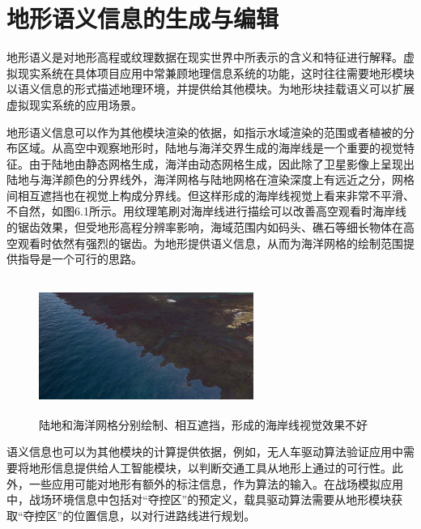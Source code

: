 
\chapter{地形语义信息的生成与编辑}
地形语义是对地形高程或纹理数据在现实世界中所表示的含义和特征进行解释。虚拟现实系统在具体项目应用中常兼顾地理信息系统的功能\supercite{沈敬伟}，这时往往需要地形模块以语义信息的形式描述地理环境，并提供给其他模块。为地形块挂载语义可以扩展虚拟现实系统的应用场景。\par
地形语义信息可以作为其他模块渲染的依据，如指示水域渲染的范围或者植被的分布区域。从高空中观察地形时，陆地与海洋交界生成的海岸线是一个重要的视觉特征。由于陆地由静态网格生成，海洋由动态网格生成，因此除了卫星影像上呈现出陆地与海洋颜色的分界线外，海洋网格与陆地网格在渲染深度上有远近之分，网格间相互遮挡也在视觉上构成分界线。但这样形成的海岸线视觉上看来非常不平滑、不自然，如图6.1所示。用纹理笔刷对海岸线进行描绘可以改善高空观看时海岸线的锯齿效果，但受地形高程分辨率影响，海域范围内如码头、礁石等细长物体在高空观看时依然有强烈的锯齿。为地形提供语义信息，从而为海洋网格的绘制范围提供指导是一个可行的思路。\par
\begin{figure}[H]
    \centering
    \includegraphics[height=4.4cm,width=7cm]{figures/shoreBad.png}
    \caption{陆地和海洋网格分别绘制、相互遮挡，形成的海岸线视觉效果不好}
\end{figure}
语义信息也可以为其他模块的计算提供依据，例如，无人车驱动算法验证应用中需要将地形信息提供给人工智能模块，以判断交通工具从地形上通过的可行性。此外，一些应用可能对地形有额外的标注信息，作为算法的输入。在战场模拟应用中，战场环境信息中包括对“夺控区”的预定义，载具驱动算法需要从地形模块获取“夺控区”的位置信息，以对行进路线进行规划。
